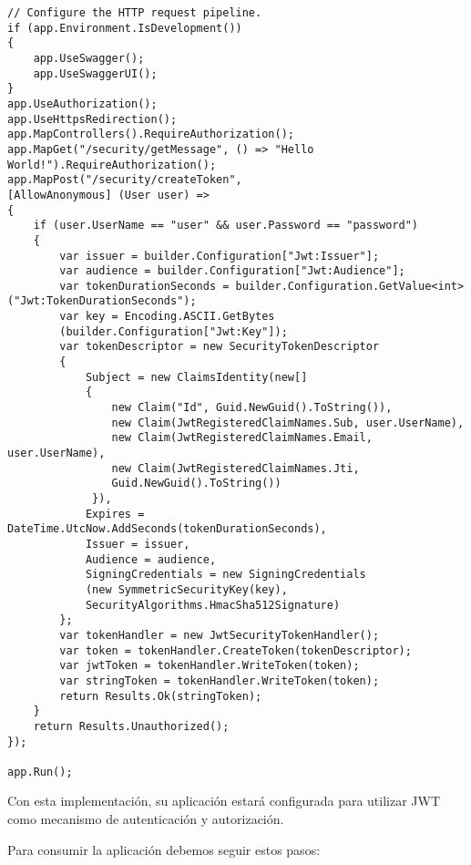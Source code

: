 \documentclass[executivepaper]{article}
\begin{document}
\begin{enumerate}
\begin{lstlisting}
// Configure the HTTP request pipeline.
if (app.Environment.IsDevelopment())
{
    app.UseSwagger();
    app.UseSwaggerUI();
}
app.UseAuthorization();
app.UseHttpsRedirection();
app.MapControllers().RequireAuthorization();
app.MapGet("/security/getMessage", () => "Hello World!").RequireAuthorization();
app.MapPost("/security/createToken",
[AllowAnonymous] (User user) =>
{
    if (user.UserName == "user" && user.Password == "password")
    {
        var issuer = builder.Configuration["Jwt:Issuer"];
        var audience = builder.Configuration["Jwt:Audience"];
        var tokenDurationSeconds = builder.Configuration.GetValue<int>("Jwt:TokenDurationSeconds");
        var key = Encoding.ASCII.GetBytes
        (builder.Configuration["Jwt:Key"]);
        var tokenDescriptor = new SecurityTokenDescriptor
        {
            Subject = new ClaimsIdentity(new[]
            {
                new Claim("Id", Guid.NewGuid().ToString()),
                new Claim(JwtRegisteredClaimNames.Sub, user.UserName),
                new Claim(JwtRegisteredClaimNames.Email, user.UserName),
                new Claim(JwtRegisteredClaimNames.Jti,
                Guid.NewGuid().ToString())
             }),
            Expires = DateTime.UtcNow.AddSeconds(tokenDurationSeconds),
            Issuer = issuer,
            Audience = audience,
            SigningCredentials = new SigningCredentials
            (new SymmetricSecurityKey(key),
            SecurityAlgorithms.HmacSha512Signature)
        };
        var tokenHandler = new JwtSecurityTokenHandler();
        var token = tokenHandler.CreateToken(tokenDescriptor);
        var jwtToken = tokenHandler.WriteToken(token);
        var stringToken = tokenHandler.WriteToken(token);
        return Results.Ok(stringToken);
    }
    return Results.Unauthorized();
});

app.Run();
\end{lstlisting}

\end{enumerate}

Con esta implementación, su aplicación estará configurada para utilizar JWT como mecanismo de autenticación y autorización.

Para consumir la aplicación debemos seguir estos pasos:
\end{document}
